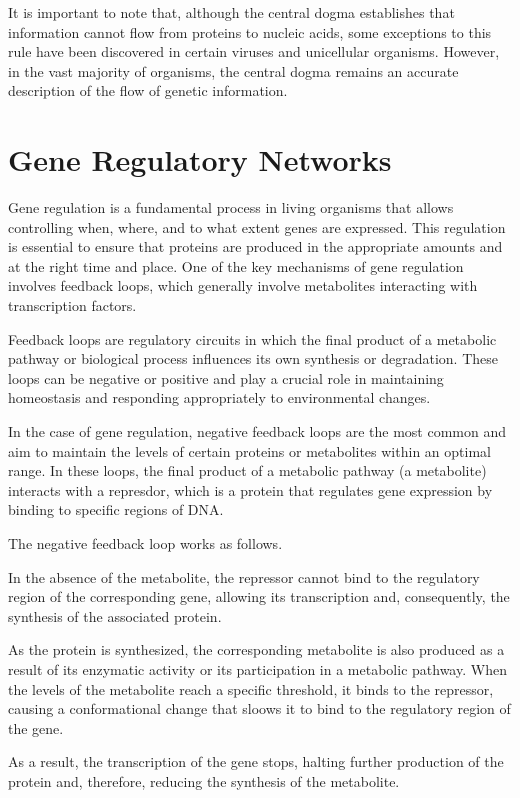 It is important to note that, although the central dogma establishes that information cannot flow from proteins to nucleic acids, some exceptions to this rule have been discovered in certain viruses and unicellular organisms. However, in the vast majority of organisms, the central dogma remains an accurate description of the flow of genetic information.

\section{Gene Regulatory Networks}

Gene regulation is a fundamental process in living organisms that allows controlling when, where, and to what extent genes are expressed. This regulation is essential to ensure that proteins are produced in the appropriate amounts and at the right time and place. One of the key mechanisms of gene regulation involves feedback loops, which generally involve metabolites interacting with transcription factors.

Feedback loops are regulatory circuits in which the final product of a metabolic pathway or biological process influences its own synthesis or degradation. These loops can be negative or positive and play a crucial role in maintaining homeostasis and responding appropriately to environmental changes.

In the case of gene regulation, negative feedback loops are the most common and aim to maintain the levels of certain proteins or metabolites within an optimal range. In these loops, the final product of a metabolic pathway (a metabolite) interacts with a represdor, which is a protein that regulates gene expression by binding to specific regions of DNA.

The negative feedback loop works as follows. 

In the absence of the metabolite, the repressor cannot bind to the regulatory region of the corresponding gene, allowing its transcription and, consequently, the synthesis of the associated protein. 

As the protein is synthesized, the corresponding metabolite is also produced as a result of its enzymatic activity or its participation in a metabolic pathway. When the levels of the metabolite reach a specific threshold, it binds to the repressor, causing a conformational change that sloows it to bind to the regulatory region of the gene.

As a result, the transcription of the gene stops, halting further production of the protein and, therefore, reducing the synthesis of the metabolite.

